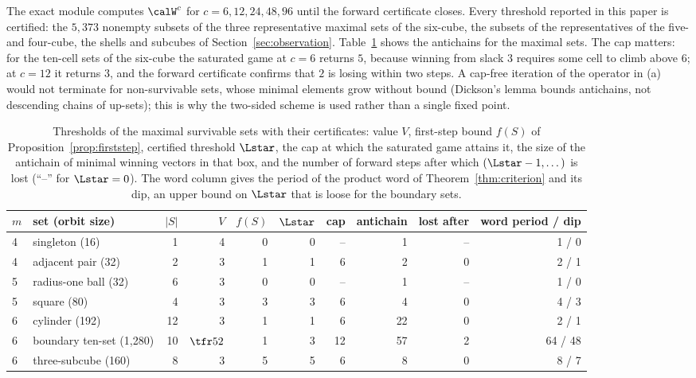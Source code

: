The exact module computes $\calW^{c}$ for $c=6,12,24,48,96$ until the forward certificate closes. Every threshold reported in this paper is certified: the $5{,}373$ nonempty subsets of the three representative maximal sets of the six-cube, the subsets of the representatives of the five- and four-cube, the shells and subcubes of Section~\ref{sec:observation}. Table~\ref{tab:game} shows the antichains for the maximal sets. The cap matters: for the ten-cell sets of the six-cube the saturated game at $c=6$ returns $5$, because winning from slack $3$ requires some cell to climb above $6$; at $c=12$ it returns $3$, and the forward certificate confirms that $2$ is losing within two steps. A cap-free iteration of the operator in (a) would not terminate for non-survivable sets, whose minimal elements grow without bound (Dickson's lemma \cite{Dickson1913} bounds antichains, not descending chains of up-sets); this is why the two-sided scheme is used rather than a single fixed point.

\begin{table}[t]
\centering\small
\caption{Thresholds of the maximal survivable sets with their certificates: value $V$, first-step bound $f(S)$ of Proposition~\ref{prop:firststep}, certified threshold $\Lstar$, the cap at which the saturated game attains it, the size of the antichain of minimal winning vectors in that box, and the number of forward steps after which $(\Lstar-1,\dots)$ is lost (``--'' for $\Lstar=0$). The word column gives the period of the product word of Theorem~\ref{thm:criterion} and its dip, an upper bound on $\Lstar$ that is loose for the boundary sets.}
\label{tab:game}
\begin{tabular}{llrrrrrrrr}
\toprule
$m$ & set (orbit size) & $|S|$ & $V$ & $f(S)$ & $\Lstar$ & cap & antichain & lost after & word period / dip\\
\midrule
4 & singleton (16) & 1 & 4 & 0 & 0 & -- & 1 & -- & 1 / 0\\
4 & adjacent pair (32) & 2 & 3 & 1 & 1 & 6 & 2 & 0 & 2 / 1\\
5 & radius-one ball (32) & 6 & 3 & 0 & 0 & -- & 1 & -- & 1 / 0\\
5 & square (80) & 4 & 3 & 3 & 3 & 6 & 4 & 0 & 4 / 3\\
6 & cylinder (192) & 12 & 3 & 1 & 1 & 6 & 22 & 0 & 2 / 1\\
6 & boundary ten-set (1{,}280) & 10 & $\tfr52$ & 1 & 3 & 12 & 57 & 2 & 64 / 48\\
6 & three-subcube (160) & 8 & 3 & 5 & 5 & 6 & 8 & 0 & 8 / 7\\
\bottomrule
\end{tabular}
\end{table}

